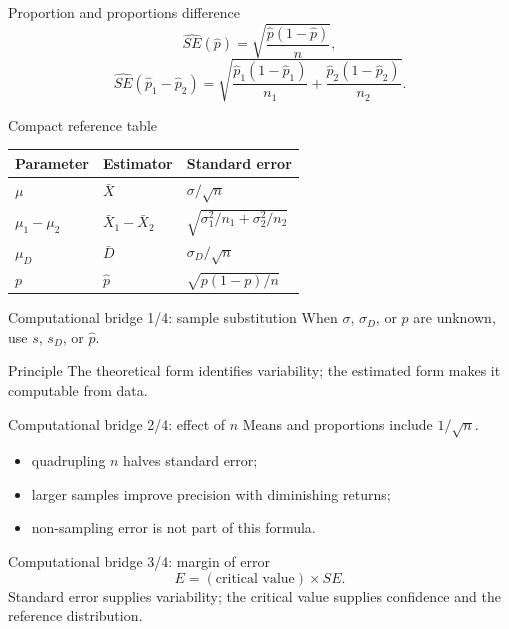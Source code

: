 \documentclass[10pt,aspectratio=169]{beamer}
\begin{document}
\begin{frame}{Proportion and proportions difference}
  \footnotesize
  \[
    \widehat{SE}(\hat p)=\sqrt{\frac{\hat p(1-\hat p)}{n}},
  \]
  \[
    \widehat{SE}(\hat p_1-\hat p_2)=
    \sqrt{\frac{\hat p_1(1-\hat p_1)}{n_1}+
    \frac{\hat p_2(1-\hat p_2)}{n_2}}.
  \]
\end{frame}

\begin{frame}{Compact reference table}
  \footnotesize
  \begin{tabular}{lll}
    \hline
    Parameter & Estimator & Standard error \\
    \hline
    $\mu$ & $\bar X$ & $\sigma/\sqrt n$ \\
    $\mu_1-\mu_2$ & $\bar X_1-\bar X_2$ & $\sqrt{\sigma_1^2/n_1+\sigma_2^2/n_2}$ \\
    $\mu_D$ & $\bar D$ & $\sigma_D/\sqrt n$ \\
    $p$ & $\hat p$ & $\sqrt{p(1-p)/n}$ \\
    \hline
  \end{tabular}
\end{frame}

\begin{frame}{Computational bridge 1/4: sample substitution}
  \footnotesize
  When $\sigma$, $\sigma_D$, or $p$ are unknown, use $s$, $s_D$, or $\hat p$.
  \begin{block}{Principle}
    The theoretical form identifies variability; the estimated form makes it
    computable from data.
  \end{block}
\end{frame}

\begin{frame}{Computational bridge 2/4: effect of $n$}
  \footnotesize
  Means and proportions include $1/\sqrt n$.
  \begin{itemize}\itemsep=0.12cm
    \item quadrupling $n$ halves standard error;
    \item larger samples improve precision with diminishing returns;
    \item non-sampling error is not part of this formula.
  \end{itemize}
\end{frame}

\begin{frame}{Computational bridge 3/4: margin of error}
  \footnotesize
  \[
    E=(\text{critical value})\times SE.
  \]
  Standard error supplies variability; the critical value supplies confidence
  and the reference distribution.
\end{frame}
\end{document}
